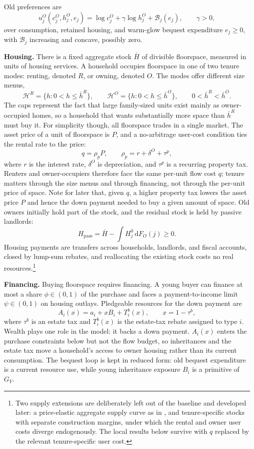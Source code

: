 \documentclass[11pt]{article}
\newcommand{\dd}{\mathrm d}
\newcommand{\1}{\mathbf 1}
\newcommand{\HH}{\mathcal H}
\begin{document}
Old preferences are
\[
u_j^O(c_j^O,h_j^O,e_j)
=
\log c_j^O+\gamma\log h_j^O+\mathcal B_j(e_j),
\qquad
\gamma>0,
\]
over consumption, retained housing, and warm-glow bequest expenditure $e_j\ge0$, with $\mathcal B_j$ increasing and concave, possibly zero.

\textbf{Housing.} There is a fixed aggregate stock $\bar H$ of divisible floorspace, measured in units of housing services. A household occupies floorspace in one of two tenure modes: renting, denoted $R$, or owning, denoted $O$. The modes offer different size menus,
\[
\HH^R=\{h:0<h\le \bar h^R\},
\qquad
\HH^O=\{h:0<h\le \bar h^O\},
\qquad
0<\bar h^R<\bar h^O.
\]
The caps represent the fact that large family-sized units exist mainly as owner-occupied homes, so a household that wants substantially more space than $\bar h^R$ must buy it. For simplicity though, all floorspace trades in a single market. The asset price of a unit of floorspace is $P$, and a no-arbitrage user-cost condition ties the rental rate to the price:
\begin{equation}
q=\rho_p P,
\qquad
\rho_p=r+\delta^O+\tau^p,
\label{eq:compact_owner_price}
\end{equation}
where $r$ is the interest rate, $\delta^O$ is depreciation, and $\tau^p$ is a recurring property tax. Renters and owner-occupiers therefore face the same per-unit flow cost $q$; tenure matters through the size menus and through financing, not through the per-unit price of space. Note for later that, given $q$, a higher property tax lowers the asset price $P$ and hence the down payment needed to buy a given amount of space. Old owners initially hold part of the stock, and the residual stock is held by passive landlords:
\[
H_{\mathrm{pass}}
=
\bar H-\int H_j^0\,\dd F_O(j)\ge0.
\]
Housing payments are transfers across households, landlords, and fiscal accounts, closed by lump-sum rebates, and reallocating the existing stock costs no real resources.\footnote{Two supply extensions are deliberately left out of the baseline and developed later: a price-elastic aggregate supply curve as in \citet{coven2024}, and tenure-specific stocks with separate construction margins, under which the rental and owner user costs diverge endogenously. The local results below survive with $q$ replaced by the relevant tenure-specific user cost.}

\textbf{Financing.} Buying floorspace requires financing. A young buyer can finance at most a share $\phi\in(0,1)$ of the purchase and faces a payment-to-income limit $\psi\in(0,1)$ on housing outlays. Pledgeable resources for the down payment are
\[
A_i(x)=a_i+xB_i+T_i^b(x),
\qquad
x=1-\tau^b,
\]
where $\tau^b$ is an estate tax and $T_i^b(x)$ is the estate-tax rebate assigned to type $i$. Wealth plays one role in the model: it backs a down payment. $A_i(x)$ enters the purchase constraints below but not the flow budget, so inheritances and the estate tax move a household's access to owner housing rather than its current consumption. The bequest loop is kept in reduced form: old bequest expenditure is a current resource use, while young inheritance exposure $B_i$ is a primitive of $G_Y$.
\end{document}
